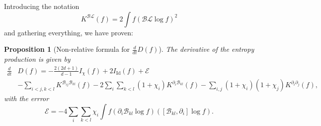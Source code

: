 \documentclass[11pt,a4paper]{article}
\theoremstyle{definition}
\theoremstyle{plain}
\newtheorem{prop}[defi]{Proposition}
\DeclareMathOperator*{\Id}{Id}
\begin{document}
Introducing the notation
$$K^{\mathcal{B}\mathcal{L}}(f)=2\int f (\mathcal{B}\mathcal{L} \log f)^2$$
and gathering everything, we have proven:
\begin{prop}[Non-relative formula for $\frac{d}{dt}D(f)$]
The derivative of the entropy production is given by
\begin{align}
\label{eq:derivD2}
    \frac{d}{dt}&D(f)
    =-\frac{2(2d+1)}{d-1}I_\chi(f)+2I_{\Id}(f)+\mathcal{E}\\
    &-\sum_{i<j,k<l}K^{ \mathcal{B}_{ij}\mathcal{B}_{kl}}(f)-2\sum_i\sum_{k<l}(1+\chi_i)K^{\partial_i\mathcal{B}_{kl} }(f)-\sum_{i,j}(1+\chi_i)(1+\chi_j)K^{\partial_i\partial_j}(f), \nonumber
\end{align}
with the errror
\begin{equation}
    \label{eq:error}
    \mathcal{E}=-4\sum_i\sum_{k<l}\chi_i \int f(\partial_i\mathcal{B}_{kl} \log f)([\mathcal{B}_{kl},\partial_i]\log f).
\end{equation}
\end{prop}
\end{document}
